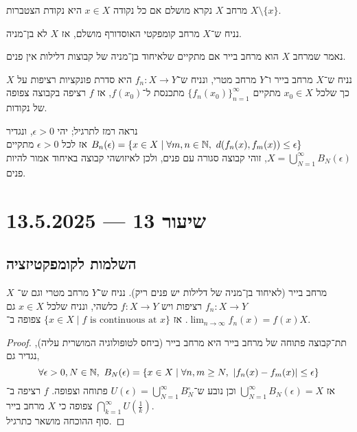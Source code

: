 \begin{definition}
	מרחב $X$ נקרא מושלם אם כל נקודה $x \in X$ היא נקודת הצטברות $X \setminus \{ x \}$.
\end{definition}
\begin{conclusion}
	נניח ש־$X$ מרחב קומפקטי האוסדורף מושלם, אז $X$ לא בן־מניה.
\end{conclusion}
\begin{definition}
	נאמר שמרחב $X$ הוא מרחב בייר אם מתקיים שלאיחוד בן־מניה של קבוצות דלילות אין פנים.
\end{definition}
\begin{exercise}
	נניח ש־$X$ מרחב בייר ו־$Y$ מרחב מטרי, ונניח ש־$f_n : X \to Y$ היא סדרת פונקציות רציפות על $X$ כך שלכל $x_0 \in X$ מתקיים ${\{ f_n(x_0) \}}_{n = 1}^\infty$ מתכנסת ל־$f(x_0)$,
	אז $f$ רציפה בקבוצה צפופה של נקודות.
\end{exercise}
נראה רמז לתרגיל;
יהי $\epsilon > 0$, ונגדיר $B_n(\epsilon) = \{ x \in X \mid \forall m, n \in \mathbb{N},\ d(f_n(x), f_m(x)) \le \epsilon \}$
אז לכל $\epsilon > 0$ מתקיים $X = \bigcup_{N = 1}^\infty B_N(\epsilon)$, זוהי קבוצה סגורה עם פנים, ולכן לאיזושהי קבוצה באיחוד אמור להיות פנים.

\section{שיעור 13 --- 13.5.2025}

\subsection{השלמות לקומפקטיזציה}
$X$ מרחב בייר (לאיחוד בן־מניה של דלילות יש פנים ריק).
נניח ש־$Y$ מרחב מטרי וגם ש־$f_n : X \to Y$ רציפות ויש $f : X \to Y$ כלשהי, ונניח שלכל $x \in X$ גם $\lim_{n \to \infty} f_n(x) = f(x)$.
אז $\{ x \in X \mid f \text{ is continuous at } x \}$ צפופה ב־$X$.
\begin{proof}
	תת־קבוצה פתוחה של מרחב בייר היא מרחב בייר (ביחס לטופולוגיה המושרית עליה),
	נגדיר גם,
	\[
		\forall \epsilon > 0, N \in \NN,\ 
		B_N(\epsilon) = \{ x \in X \mid \forall n, m \ge N,\ |f_n(x) - f_m(x)| \le \epsilon \}
	\]
	אז $\bigcup_{N = 1}^\infty B_N(\epsilon) = X$ וכן נובע ש־$U(\epsilon) = \bigcup_{N = 1}^\infty B_N^\circ$ פתוחה וצפופה.
	$f$ רציפה ב־$\bigcap_{k = 1}^\infty U(\frac{1}{k})$ צפופה כי $X$ מרחב בייר. \\
	סוף ההוכחה מושאר כתרגיל.
\end{proof}

